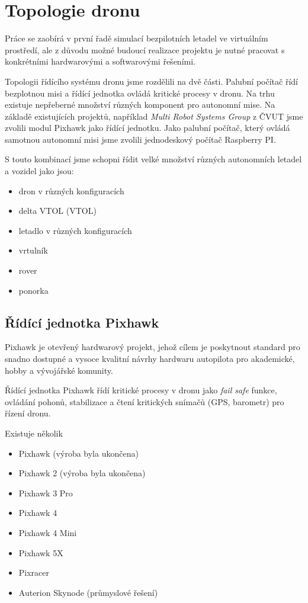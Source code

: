 \chapter{Topologie dronu}

Práce se zaobírá v první řadě simulací bezpilotních letadel ve virtuálním prostředí, ale z důvodu možné budoucí realizace projektu je nutné pracovat s konkrétními hardwarovými a softwarovými řešeními.

Topologii řídícího systému dronu jsme rozdělili na dvě části. Palubní počítač řídí bezplotnou misi a řídící jednotka ovládá kritické procesy v dronu. Na trhu existuje nepřeberné množství různých komponent pro autonomní mise. Na základě existujících projektů, například \textit{Multi Robot Systems Group} z ČVUT \cite{MRS} jsme zvolili modul Pixhawk jako řídící jednotku. Jako palubní počítač, který ovládá samotnou autonomní misi jsme zvolili jednodeskový počítač Raspberry PI.

S touto kombinací jsme schopni řídit velké množství různých autonomních letadel a vozidel jako jsou:

\begin{itemize}
    \item dron v různých konfiguracích
    \item delta \acs{VTOL} (\acl{VTOL})
    \item letadlo v různých konfiguracích
    \item vrtulník
    \item rover
    \item ponorka
\end{itemize}

\section{Řídící jednotka Pixhawk}

Pixhawk je otevřený hardwarový projekt, jehož cílem je poskytnout standard pro snadno dostupné a vysoce kvalitní návrhy hardwaru autopilota pro akademické, hobby a vývojářské komunity. \cite{PIX1}

Řídící jednotka Pixhawk řídí kritické procesy v dronu jako \textit{fail safe} funkce, ovládání pohonů, stabilizace a čtení kritických snímačů (GPS, barometr) pro řízení dronu.

Existuje několik 

\begin{itemize}
    \item Pixhawk (výroba byla ukončena)
    \item Pixhawk 2 (výroba byla ukončena)
    \item Pixhawk 3 Pro
    \item Pixhawk 4
    \item Pixhawk 4 Mini
    \item Pixhawk 5X
    \item Pixracer
    \item Auterion Skynode (průmyslové řešení)
\end{itemize}

